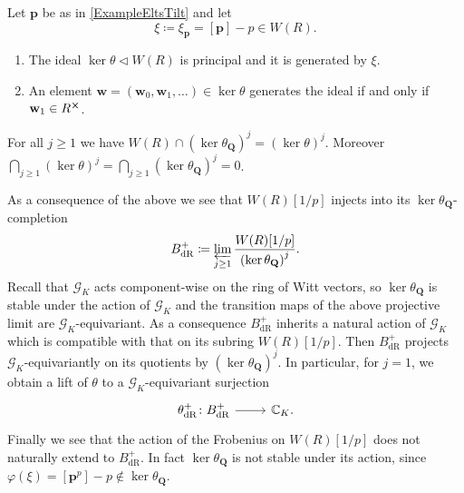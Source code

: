 \begin{prop}
	Let $\mathbf{p}$ be as in \cref{ExampleEltsTilt} and let
	\begin{equation*}
		\xi \coloneqq \xi_{\mathbf{p}} = [\mathbf{p}] - p \in W(R)
	.\end{equation*}
\begin{enumerate}
	\item The ideal $\ker \theta \triangleleft W(R)$ is principal and it is generated
		by $\xi$.
	\item An element $\mathbf{w} = (\mathbf{w}_0, \mathbf{w}_1, \ldots) \in \ker\theta$ generates
		the ideal if and only if $\mathbf{w}_1 \in R^{\cross}$.
\end{enumerate}
\end{prop}


\begin{cor}
	For all $j \geq 1$ we have $W(R) \cap \left( \ker \theta_{\mathbf{Q}} \right)^j =
	\left( \ker \theta \right)^j$.
	Moreover $\bigcap_{j \geq 1} \left( \ker \theta \right)^j =
	\bigcap_{j \geq 1} \left( \ker \theta_{\mathbf{Q}} \right)^j = 0$.
\end{cor} 


\begin{rem}[]\label{kerQGKStable}
	As a consequence of the above we see that $W(R)[1/p]$
	injects into its $\ker \theta_{\mathbf{Q}}$-completion
	\begin{equation*}
	B^+_{\mathrm{dR}} \coloneqq \varprojlim_{j \geq 1}
	\frac{ W(R)[1/p] }{ \left( \ker \theta_{\mathbf{Q}} \right)^j }
	.\end{equation*}
	Recall that $\mathscr{G}_K$ acts component-wise on the ring of Witt vectors,
	so $\ker \theta_{\mathbf{Q}}$ is stable under the action of $\mathscr{G}_K$
	and the transition maps of the above projective limit are $\mathscr{G}_K$-equivariant.
	As a consequence $B^+_{\mathrm{dR}}$ inherits a natural action of $\mathscr{G}_K$
	which is compatible with that on its subring $W(R)[1/p]$.
	Then $B^+_{\mathrm{dR}}$ projects $\mathscr{G}_K$-equivariantly on its quotients
	by $\left( \ker \theta_{\mathbf{Q}} \right)^j$.
	In particular, for $j = 1$, we obtain a lift of $\theta$ 
	to a $\mathscr{G}_K$-equivariant surjection
	\begin{equation*}
	\begin{tikzcd}[row sep = 0ex
		,/tikz/column 1/.append style={anchor=base east}
		,/tikz/column 2/.append style={anchor=base west}]
		\theta^+_{\mathrm{dR}}\colon B^+_{\mathrm{dR}} \arrow[r, "", rightarrow] &
		\mathbb{C}_K
	.\end{tikzcd}
	\end{equation*} 
	Finally we see that the action of the Frobenius on $W(R)[1/p]$
	does not naturally extend to $B^+_{\mathrm{dR}}$.
	In fact $\ker \theta_{\mathbf{Q}}$ is not stable under its action,
	since $\varphi(\xi) = [\mathbf{p}^p] - p \notin \ker \theta_{\mathbf{Q}}$.
\end{rem}


